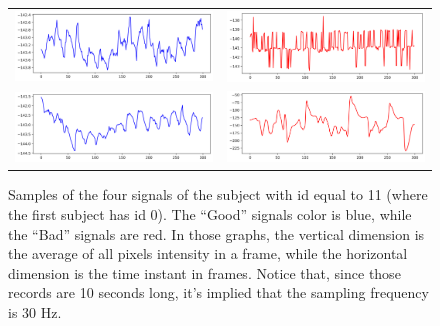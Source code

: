 
\begin{figure}
	\begin{tabular}{cc}
		\includegraphics[width=0.45\linewidth]{img/samples/butppg_111001.png} 
			& \includegraphics[width=0.45\linewidth]{img/samples/butppg_111003.png} \\
		\includegraphics[width=0.45\linewidth]{img/samples/butppg_111002.png} 
			& \includegraphics[width=0.45\linewidth]{img/samples/butppg_111004.png} \\
	\end{tabular}
	\caption{Samples of the four signals of the subject with id equal to 11 (where the first subject has id 0). The ``Good'' signals color is blue, while the ``Bad'' signals are red. In those graphs, the vertical dimension is the average of all pixels intensity in a frame, while the horizontal dimension is the time instant in frames. Notice that, since those records are 10 seconds long, it's implied that the sampling frequency is 30 Hz.}
	\label{fig:butppg_samples}
\end{figure}
